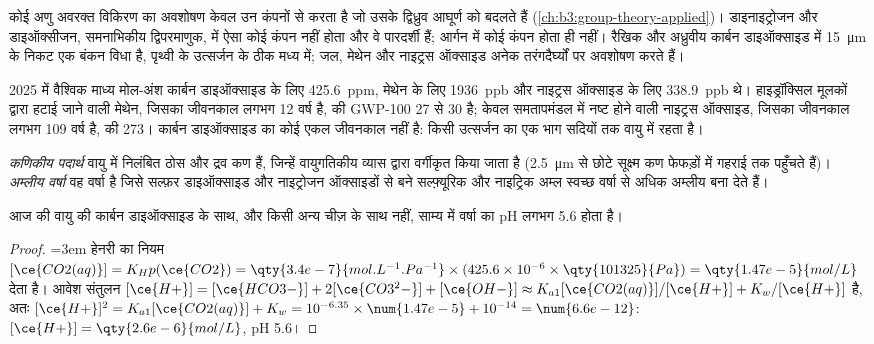 कोई अणु अवरक्त विकिरण का अवशोषण केवल उन कंपनों से करता है जो उसके
द्विध्रुव आघूर्ण को बदलते हैं (\cref{ch:b3:group-theory-applied})। डाइनाइट्रोजन और डाइऑक्सीजन,
समनाभिकीय द्विपरमाणुक, में ऐसा कोई कंपन नहीं होता और वे पारदर्शी हैं; आर्गन में कोई
कंपन होता ही नहीं। रैखिक और अध्रुवीय कार्बन डाइऑक्साइड में
\qty{15}{\micro\metre} के निकट एक  बंकन विधा है, पृथ्वी के उत्सर्जन के ठीक मध्य में; जल, मेथेन
और नाइट्रस ऑक्साइड अनेक तरंगदैर्घ्यों पर अवशोषण करते हैं।

2025 में वैश्विक माध्य मोल-अंश कार्बन डाइऑक्साइड के लिए \qty{425.6}{ppm}, मेथेन के लिए \qty{1936}{ppb} और
नाइट्रस ऑक्साइड के लिए \qty{338.9}{ppb} थे। हाइड्रॉक्सिल मूलकों द्वारा हटाई जाने वाली मेथेन, जिसका
जीवनकाल लगभग 12 वर्ष है, की GWP-100 27 से 30 है; केवल समतापमंडल में नष्ट होने वाली
नाइट्रस ऑक्साइड, जिसका जीवनकाल लगभग 109 वर्ष है, की 273। कार्बन डाइऑक्साइड का कोई
एकल जीवनकाल नहीं है: किसी उत्सर्जन का एक भाग सदियों तक वायु में रहता है।

\begin{definition}[वायु प्रदूषक]\label{def:b3:environmental-toxicology:pollutants}
\emph{कणिकीय पदार्थ} वायु में निलंबित ठोस और द्रव
कण हैं, जिन्हें वायुगतिकीय व्यास द्वारा वर्गीकृत किया जाता है (\qty{2.5}{\micro\metre} से छोटे
सूक्ष्म कण फेफड़ों में गहराई तक पहुँचते हैं)। \emph{अम्लीय
वर्षा} वह वर्षा है जिसे सल्फ़र डाइऑक्साइड और नाइट्रोजन ऑक्साइडों से बने सल्फ़्यूरिक और
नाइट्रिक अम्ल स्वच्छ वर्षा से अधिक अम्लीय बना देते हैं।
\end{definition}

\begin{proposition}[स्वच्छ वर्षा का pH]\label{prop:b3:environmental-toxicology:rain-ph}
आज की वायु की कार्बन डाइऑक्साइड के साथ, और किसी अन्य चीज़ के साथ नहीं, साम्य में
वर्षा का pH लगभग 5.6 होता है।
\end{proposition}

\begin{proof}
\emergencystretch=3em हेनरी का नियम $[\ce{CO2(aq)}] = K_Hp(\ce{CO2}) = \qty{3.4e-7}{mol.L^{-1}.Pa^{-1}} \times (425.6 \times 10^{-6} \times \qty{101325}{Pa}) = \qty{1.47e-5}{mol/L}$ देता है।
आवेश संतुलन $[\ce{H+}] = [\ce{HCO3-}] + 2[\ce{CO3^2-}] + [\ce{OH-}] \approx K_{a1}[\ce{CO2(aq)}]/[\ce{H+}] + K_w/[\ce{H+}]$ है, अतः
$[\ce{H+}]^2 = K_{a1}[\ce{CO2(aq)}] + K_w = 10^{-6.35} \times \num{1.47e-5} + 10^{-14} = \num{6.6e-12}$: $[\ce{H+}] = \qty{2.6e-6}{mol/L}$, pH 5.6।
\end{proof}

